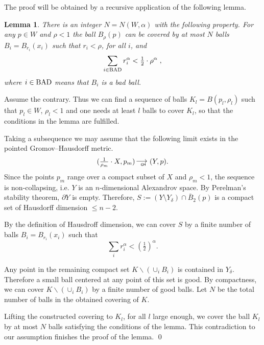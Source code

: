 \documentclass[12pt,leqno,intlimits]{amsart}
\numberwithin{equation}{section}
\newtheorem{lem}[thm]{Lemma}
\theoremstyle{definition}
\theoremstyle{remark}
\def\BAD{\mathop{\rm BAD}\nolimits}%
\newcommand*{\GHto}{\mathbin{\begin{picture}(16,3.5)
\put(-1,1){$\longrightarrow$}
\put(13,-3){\llap{\text{\sf\tiny GH}}}
\end{picture}}}
\def\parit#1{\medskip\noindent{\it #1}}
\def\qeds{\qed\par\medskip}
\begin{document}
The proof will be obtained by a recursive application of the following lemma.

\begin{lem}\label{lem:covering}
There is an integer $N  =N(W,\alpha) $ with the following property. For any $p\in W$ and $\rho < 1$
the ball $B_{\rho}(p)$ can be covered by at most $N$ balls
 $B_i=B_{r_i}(x_i)$ such that $r_i <\rho$, for all $i$, and
$$ \sum_{i\in \BAD}r_i^{\alpha}< \tfrac12\cdot \rho^{\alpha} \; ,$$
where $i\in \BAD$ means that $B_i$ is a bad ball.
\end{lem}

\parit{Proof.}
Assume the contrary. Thus we can find   a sequence of  balls
$K_l=B(p_l,\rho_l)$
such that $p_l\in W$,
$\rho_l<1$ and
one needs at least $l$ balls to cover $K_l$, so that the conditions in the lemma are fulfilled.

Taking a subsequence we may assume that the following limit exists in the pointed Gromov--Hausdorff metric.
$$(\tfrac1{\rho_m}\cdot X,p_m)\GHto (Y,p).$$
Since the points $p_m$ range over a compact subset of $X$ and   $\rho _m <1$, the
sequence is non-collapsing, i.e. $Y$ is an $n$-dimensional Alexandrov space.
By Perelman's stability theorem, $\partial Y$  is empty.
Therefore,  $S:= (Y\setminus Y_{\delta} ) \cap \bar B_2 (p)$ is a compact set of   Hausdorff dimension $\le n-2$.

By the definition of Hausdroff dimension, we can cover $S$ by a finite number of balls
$B_i=B_{r_i}(x_i)$ such that
$$\sum_ir_i^{\alpha} < (\tfrac12)^{\alpha}.$$


Any point in the remaining compact set $K\backslash (\cup_i B_i)$
is contained  in $Y_{\delta}$. Therefore a small ball centered at any point of this set is good.
By compactness, we can cover $K\backslash (\cup_i B_i)$ by a finite number of good balls.
Let $N$ be the total number of balls in the obtained covering of $K$.

Lifting the constructed covering to $K_l$, for all $l$ large enough,
we cover
the ball $K_l$ by at most $N$ balls satisfying the conditions of the lemma.
This  contradiction to our assumption finishes the proof of the lemma.
\qeds
\end{document}

